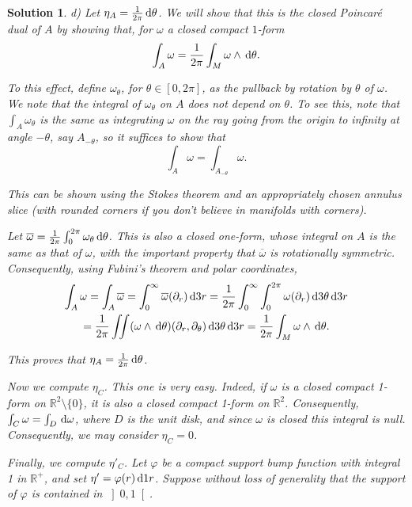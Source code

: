 \documentclass{article}
\theoremstyle{nonumberplain}
\newtheorem{sol}{Solution}
\newcommand{\R}{\mathbb{R}}
\begin{document}
\begin{sol}
\medskip

d) Let $\eta_A = \frac1{2\pi} \dl \theta$. We will show that this is the closed Poincaré dual of $A$ by showing that, for $\omega$ a closed compact $1$-form
\[\int_A \omega = \frac1{2\pi} \int_M \omega \wedge \dl \theta.\]

To this effect, define $\omega_\theta$, for $\theta \in [0,2\pi]$, as the pullback by rotation by $\theta$ of $\omega$. We note that the integral of $\omega_\theta$ on $A$ does not depend on $\theta$. To see this, note that $\int_A \omega_\theta$ is the same as integrating $\omega$ on the ray going from the origin to infinity at angle $-\theta$, say $A_{-\theta}$, so it suffices to show that
\[\int_A \omega = \int_{A_{-\theta}} \omega.\]

This can be shown using the Stokes theorem and an appropriately chosen annulus slice (with rounded corners if you don't believe in manifolds with corners).

Let $\overline{\omega} = \frac1{2\pi} \int_0^{2\pi} \omega_\theta \dl \theta$. This is also a closed one-form, whose integral on $A$ is the same as that of $\omega$, with the important property that $\overline\omega$ is rotationally symmetric. Consequently, using Fubini's theorem and polar coordinates,
\begin{multline*}
\int_A \omega = \int_A \overline{\omega} = \int_0^\infty \overline{\omega}(\partial_r) \dl3 r = \frac1{2\pi} \int_0^\infty \int_0^{2\pi} \omega(\partial_r) \dl3 \theta \dl3 r\\
= \frac1{2\pi} \iint (\omega \wedge \dl \theta)(\partial_r, \partial_\theta) \dl3\theta \dl3r = \frac1{2\pi} \int_M \omega \wedge \dl \theta.
\end{multline*}

This proves that $\eta_A = \frac1{2\pi} \dl \theta$.

\smallskip

Now we compute $\eta_C$. This one is very easy. Indeed, if $\omega$ is a closed compact 1-form on $\R^2 \setminus \{0\}$, it is also a closed compact 1-form on $\R^2$. Consequently, $\int_C \omega = \int_D \dl \omega$, where $D$ is the unit disk, and since $\omega$ is closed this integral is null. Consequently, we may consider $\eta_C = 0$.

Finally, we compute $\eta'_C$. Let $\varphi$ be a compact support bump function with integral 1 in $\R^+$, and set $\eta' = \varphi(r) \dl1 r$. Suppose without loss of generality that the support of $\varphi$ is contained in $\left]0,1\right[$.


\end{sol}
\end{document}
